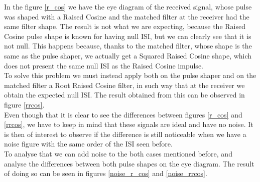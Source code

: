 In the figure \ref{r_cos} we have the eye diagram of the received signal, whose pulse was shaped with a Raised Cosine and the matched filter at the receiver had the same filter shape. The result is not what we are expecting, because the Raised Cosine pulse shape is known for having null ISI, but we can clearly see that it is not null. This happens because, thanks to the matched filter, whose shape is the same as the pulse shaper, we actually get a Squared Raised Cosine shape, which does not present the same null ISI as the Raised Cosine impulse.\\
To solve this problem we must instead apply both on the pulse shaper and on the matched filter a Root Raised Cosine filter, in such way that at the receiver we obtain the expected null ISI. The result obtained from this can be observed in figure \ref{rrcos}.\\
Even though that it is clear to see the differences between figures  \ref{r_cos} and  \ref{rrcos}, we have to keep in mind that these signals are ideal and have no noise. It is then of interest to observe if the difference is still noticeable when we have a noise figure with the same order of the ISI seen before.\\
To analyse that we can add noise to the both cases mentioned before, and analyse the differences between both pulse shapes on the eye diagram. The result of doing so can be seen in figures  \ref{noise_r_cos} and  \ref{noise_rrcos}.
